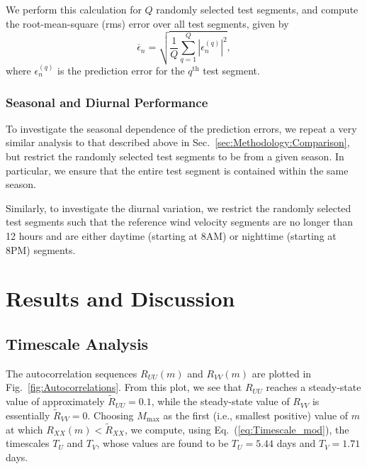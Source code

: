\documentclass[11pt, oneside]{article}
\newcommand{\figref}[1]{Fig.~\ref{#1}}
\newcommand{\eqnref}[1]{Eq.~(\ref{#1})}
\newcommand{\secref}[1]{Sec.~\ref{#1}}
\begin{document}
We perform this calculation for $Q$ randomly selected test segments, and compute the root-mean-square (rms) error over all test segments, given by
\begin{equation}\label{eq:RMSError}
\overline{\epsilon}_n = \sqrt{ \frac{1}{Q} \sum_{q = 1}^Q \left| \epsilon_n^{(q)} \right|^2 },
\end{equation}
where $\epsilon_n^{(q)}$ is the prediction error for the $q^\text{th}$ test segment.

\subsubsection{Seasonal and Diurnal Performance}
To investigate the seasonal dependence of the prediction errors, we repeat a very similar analysis to that described above in \secref{sec:Methodology:Comparison}, but restrict the randomly selected test segments to be from a given season.
In particular, we ensure that the entire test segment is contained within the same season.

Similarly, to investigate the diurnal variation, we restrict the randomly selected test segments such that the reference wind velocity segments are no longer than 12 hours and are either daytime (starting at 8AM) or nighttime (starting at 8PM) segments.

\section{Results and Discussion}\label{sec:Results}

\subsection{Timescale Analysis}
The autocorrelation sequences $R_{UU}(m)$ and $R_{VV}(m)$ are plotted in \figref{fig:Autocorrelations}.
From this plot, we see that $R_{UU}$ reaches a steady-state value of approximately $\tilde{R}_{UU} = 0.1$, while the steady-state value of $R_{VV}$ is essentially $\tilde{R}_{VV} = 0$.
Choosing $M_\text{max}$ as the first (i.e., smallest positive) value of $m$ at which $R_{XX}(m) < \tilde{R}_{XX}$, we compute, using \eqnref{eq:Timescale_mod}, the timescales $T_U$ and $T_V$,
whose values are found to be $T_U = 5.44$ days and $T_V = 1.71$ days.
\end{document}

